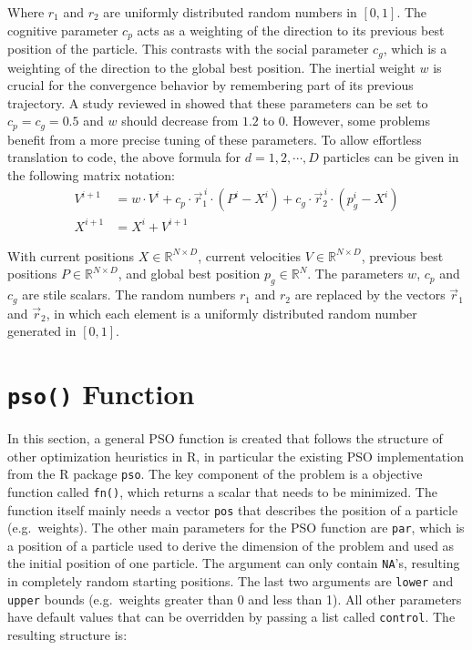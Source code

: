 \documentclass[
  oneside]{book}
\begin{document}
Where \(r_1\) and \(r_2\) are uniformly distributed random numbers in \([0, 1]\). The cognitive parameter \(c_p\) acts as a weighting of the direction to its previous best position of the particle. This contrasts with the social parameter \(c_g\), which is a weighting of the direction to the global best position. The inertial weight \(w\) is crucial for the convergence behavior by remembering part of its previous trajectory. A study reviewed in \citep{PaVr2002} showed that these parameters can be set to \(c_p=c_g=0.5\) and \(w\) should decrease from \(1.2\) to \(0\). However, some problems benefit from a more precise tuning of these parameters. To allow effortless translation to code, the above formula for \(d = 1, 2, \cdots, D\) particles can be given in the following matrix notation:
\begin{align*}
  V^{i+1} &= w \cdot V^{i} + c_p \cdot \vec{r}_1^{\,i} \cdot (P^i-X^i) + c_g \cdot \vec{r}_2^{\,i} \cdot (p_g^i - X^i) \\
  X^{i+1} &= X^i + V^{i+1}
\end{align*}

With current positions \(X \in \mathbb{R}^{N \times D}\), current velocities \(V \in \mathbb{R}^{N \times D}\), previous best positions \(P \in \mathbb{R}^{N \times D}\), and global best position \(p_g \in \mathbb{R}^{N}\). The parameters \(w\), \(c_p\) and \(c_g\) are stile scalars. The random numbers \(r_1\) and \(r_2\) are replaced by the vectors \(\vec{r}_1\) and \(\vec{r}_2\), in which each element is a uniformly distributed random number generated in \([0, 1]\).

\hypertarget{pso-function}{%
\section{\texorpdfstring{\texttt{pso()} Function}{pso() Function}}\label{pso-function}}

In this section, a general PSO function is created that follows the structure of other optimization heuristics in R, in particular the existing PSO implementation from the R package \texttt{pso}. The key component of the problem is a objective function called \texttt{fn()}, which returns a scalar that needs to be minimized. The function itself mainly needs a vector \texttt{pos} that describes the position of a particle (e.g.~weights). The other main parameters for the PSO function are \texttt{par}, which is a position of a particle used to derive the dimension of the problem and used as the initial position of one particle. The argument can only contain \texttt{NA}'s, resulting in completely random starting positions. The last two arguments are \texttt{lower} and \texttt{upper} bounds (e.g.~weights greater than 0 and less than 1). All other parameters have default values that can be overridden by passing a list called \texttt{control}. The resulting structure is:
\end{document}
